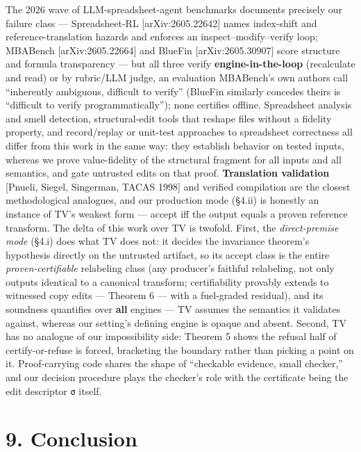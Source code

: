 \documentclass[
  11pt,
]{article}
\begin{document}
The 2026 wave of LLM-spreadsheet-agent benchmarks documents precisely
our failure class --- Spreadsheet-RL {[}arXiv:2605.22642{]} names
index-shift and reference-translation hazards and enforces an
inspect--modify--verify loop; MBABench {[}arXiv:2605.22664{]} and
BlueFin {[}arXiv:2605.30907{]} score structure and formula transparency
--- but all three verify \textbf{engine-in-the-loop} (recalculate and
read) or by rubric/LLM judge, an evaluation MBABench's own authors call
``inherently ambiguous, difficult to verify'' (BlueFin similarly
concedes theirs is ``difficult to verify programmatically''); none
certifies offline. Spreadsheet analysis and smell detection,
structural-edit tools that reshape files without a fidelity property,
and record/replay or unit-test approaches to spreadsheet correctness all
differ from this work in the same way: they establish behavior on tested
inputs, whereas we prove value-fidelity of the structural fragment for
all inputs and all semantics, and gate untrusted edits on that proof.
\textbf{Translation validation} {[}Pnueli, Siegel, Singerman, TACAS
1998{]} and verified compilation are the closest methodological
analogues, and our production mode (§4.ii) is honestly an instance of
TV's weakest form --- accept iff the output equals a proven reference
transform. The delta of this work over TV is twofold. First, the
\emph{direct-premise mode} (§4.i) does what TV does not: it decides the
invariance theorem's hypothesis directly on the untrusted artifact, so
its accept class is the entire \emph{proven-certifiable} relabeling
class (any producer's faithful relabeling, not only outputs identical to
a canonical transform; certifiability provably extends to witnessed copy
edits --- Theorem 6 --- with a fuel-graded residual), and its soundness
quantifies over \textbf{all} engines --- TV assumes the semantics it
validates against, whereas our setting's defining engine is opaque and
absent. Second, TV has no analogue of our impossibility side: Theorem 5
shows the refusal half of certify-or-refuse is forced, bracketing the
boundary rather than picking a point on it. Proof-carrying code shares
the shape of ``checkable evidence, small checker,'' and our decision
procedure plays the checker's role with the certificate being the edit
descriptor \texttt{σ} itself.

\section{9. Conclusion}\label{conclusion}
\end{document}
